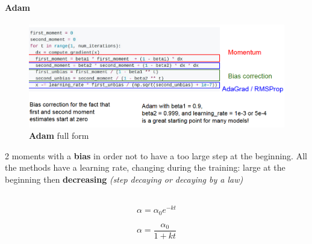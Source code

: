 \documentclass[11pt]{article}
\begin{document}
\paragraph{Adam}
\begin{figure}[h]
\centering
\captionsetup{justification=centering}
\includegraphics[width=0.9\linewidth]{L617.pdf}
\caption{ \textbf{Adam} full form}
\label{fig:L617}
\end{figure}
2 moments with a \textbf{bias} in order not to have a too large step at the beginning.
All the methods have a learning rate, changing during the training:
large at the beginning then \textbf{decreasing}
\textit{(step decaying or decaying by a law)}\\\\
\begin{minipage}{0.5\textwidth}
\begin{equation}
    \alpha = \alpha_0 e^{-kt}
\end{equation}{}
\end{minipage}
\begin{minipage}{0.5\textwidth}
\begin{equation}
    \alpha=\frac{\alpha_0}{1+kt}
\end{equation}{}
\end{minipage}
\end{document}
